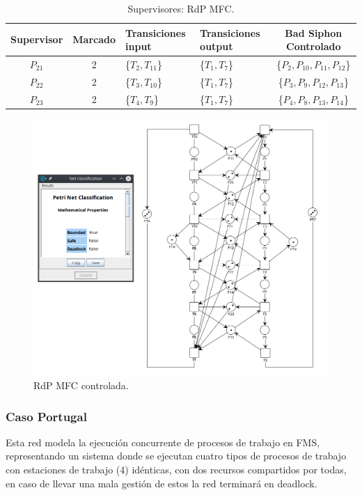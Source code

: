 \begin{table}[H]
    \centering
    \begin{tabular}{|c|c|P{2.2cm}|P{2.2cm}|c|}
    \hline
    \textbf{Supervisor} & \textbf{Marcado} & \textbf{Transiciones input} & \textbf{Transiciones output} & \textbf{Bad Siphon Controlado}  \\  \hline
    $P_{21}$ & 2 & \{$T_{2}, T_{11}$\} & \{$T_{1}, T_{7}$\} & \{$P_{2},P_{10},P_{11}, P_{12}$\} \\ 
    \hline
    $P_{22}$ & 2 & \{$T_{3}, T_{10}$\} & \{$T_{1}, T_{7}$\} & \{$P_3, P_{9}, P_{12}, P_{13}$\} \\ 
    \hline
    $P_{23}$ & 2 & \{$T_{4}, T_{9}$\} & \{$T_{1}, T_{7}$\} & \{$P_{4},P_{8},P_{13},P_{14}$\} \\ 
    \hline
    \end{tabular}
    \caption{Supervisores: RdP MFC.}
    \label{tab:MFC-v3}
\end{table}

\begin{figure}[H]
	\centering
	\includegraphics[scale=0.5]{Figures/algoritmo3/MFC2.png}
	\caption{RdP MFC controlada.}
	\label{fig:mfc_controlada}
 \end{figure}
\bigskip

\subsubsection{Caso Portugal} \label{sub:portugal}
Esta red modela la ejecución concurrente de procesos de trabajo en FMS, representando un sistema donde se ejecutan cuatro tipos de procesos de trabajo con estaciones de trabajo (4) idénticas, con dos recursos compartidos por todas, en caso de llevar una mala gestión de estos la red terminará en deadlock.

